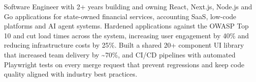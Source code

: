 

\begin{cvparagraph}

Software Engineer with 2+ years building and owning React, Next.js, Node.js and Go applications for state-owned
financial services, accounting SaaS, low-code platforms and AI agent systems. Hardened applications against the
OWASP Top 10 and cut load times across the system, increasing user engagement by 40\% and reducing infrastructure
costs by 25\%. Built a shared 20+ component UI library that increased team delivery by \textasciitilde70\%, and
CI/CD pipelines with automated Playwright tests on every merge request that prevent regressions and keep code quality
aligned with industry best practices.
\end{cvparagraph}
